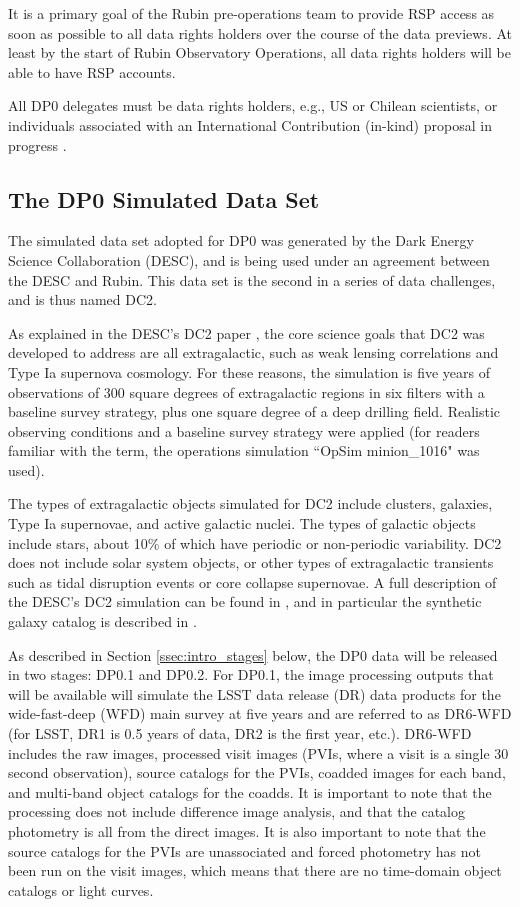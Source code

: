 \documentclass[DM,lsstdraft,authoryear,toc]{lsstdoc}
\begin{document}
It is a primary goal of the Rubin pre-operations team to provide RSP access as soon as possible to all data rights holders over the course of the data previews. 
At least by the start of Rubin Observatory Operations, all data rights holders will be able to have RSP accounts.

All DP0 delegates must be data rights holders, e.g., US or Chilean scientists, or individuals associated with an International Contribution (in-kind) proposal in progress .


\subsection{The DP0 Simulated Data Set}\label{ssec:intro_dc2}

The simulated data set adopted for DP0 was generated by the Dark Energy Science Collaboration (DESC), and is being used under an agreement between the DESC and Rubin.
This data set is the second in a series of data challenges, and is thus named DC2.

As explained in the DESC's DC2 paper \citep{2020arXiv201005926L}, the core science goals that DC2 was developed to address are all extragalactic, such as weak lensing correlations and Type Ia supernova cosmology.
For these reasons, the simulation is five years of observations of 300 square degrees of extragalactic regions in six filters with a baseline survey strategy, plus one square degree of a deep drilling field.
Realistic observing conditions and a baseline survey strategy were applied (for readers familiar with the term, the operations simulation ``OpSim minion\_1016" was used).

The types of extragalactic objects simulated for DC2 include clusters, galaxies, Type Ia supernovae, and active galactic nuclei.
The types of galactic objects include stars, about 10\% of which have periodic or non-periodic variability.
DC2 does not include solar system objects, or other types of extragalactic transients such as tidal disruption events or core collapse supernovae.
A full description of the DESC's DC2 simulation can be found in \citep{2020arXiv201005926L}, and in particular the synthetic galaxy catalog is described in \citet{2019ApJS..245...26K}.

As described in Section \ref{ssec:intro_stages} below, the DP0 data will be released in two stages: DP0.1 and DP0.2.
For DP0.1, the image processing outputs that will be available will simulate the LSST data release (DR) data products for the wide-fast-deep (WFD) main survey at five years and are referred to as DR6-WFD (for LSST, DR1 is 0.5 years of data, DR2 is the first year, etc.).
DR6-WFD includes the raw images, processed visit images (PVIs, where a visit is a single 30 second observation), source catalogs for the PVIs, coadded images for each band, and multi-band object catalogs for the coadds.
It is important to note that the processing does not include difference image analysis, and that the catalog photometry is all from the direct images.
It is also important to note that the source catalogs for the PVIs are unassociated and forced photometry has not been run on the visit images, which means that there are no time-domain object catalogs or light curves.
\end{document}

